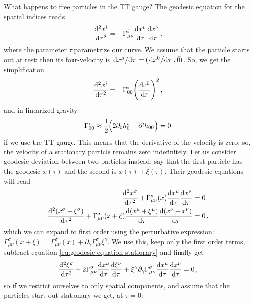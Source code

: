 \documentclass[main.tex]{subfiles}
\begin{document}
What happens to free particles in the TT gauge? The geodesic equation for the spatial indices reads 
%
\begin{align}
\dv[2]{x^{i}}{\tau} = - \Gamma^{i}_{\mu \nu } \dv{x^{\mu }}{\tau } \dv{x^{\nu }}{\tau }
\,,
\end{align}
%
where the parameter \(\tau \) parametrize our curve. 
We assume that the particle starts out at rest: then its four-velocity is \(\dv*{x^{\mu }}{\tau } = (\dv*{x^{0}}{\tau }, \vec{0})\). So, we get the simplification 
%
\begin{align}
  \dv[2]{x^{i}}{\tau} =
  - \Gamma^{i}_{00} \qty(\dv{x^{0}}{\tau })^2
\,,
\end{align}
%
and in linearized gravity  
%
\begin{align}
\Gamma^{i}_{00} \approx \frac{1}{2} \qty(2 \partial_0 h^{i}_{0} - \partial^{i} h_{00} ) =0
\,
\end{align}
%
if we use the TT gauge. 
This means that the derivative of the velocity is zero: so, the velocity of a stationary particle remains zero indefinitely. 
Let us consider geodesic deviation between two particles instead: say that the first particle has the geodesic \(x(\tau )\) and the second is \(x(\tau ) + \xi (\tau )\). Their geodesic equations will read 
%
\begin{subequations}
\begin{align}
\dv[2]{x^{\sigma }}{\tau } + \Gamma^{\sigma }_{\mu \nu } (x) \dv{x^{\mu  }}{\tau } \dv{x^{\nu }}{\tau } &= 0 \label{eq:geodesic-equation-stationary}\\
\dv[2]{(x^{\sigma } + \xi^{\sigma}) }{\tau } + \Gamma^{\sigma }_{\mu \nu } (x + \xi ) \dv{(x^{\mu  } + \xi^{\mu })}{\tau } \dv{(x^{\nu } + x^{\nu })}{\tau } &= 0 
\,,
\end{align}
\end{subequations}
%
which we can expand to first order using the perturbative expression: \(\Gamma^{\sigma }_{\mu \nu } (x + \xi ) = \Gamma^{\sigma }_{\mu \nu } (x) + \partial_{\gamma } \Gamma^{\sigma }_{\mu \nu } \xi^{\gamma } \). We use this, keep only the first order terms, subtract equation \eqref{eq:geodesic-equation-stationary} and finally get 
%
\begin{align}
\dv[2]{\xi^{\sigma }}{\tau } + 2 \Gamma^{\sigma}_{\mu \nu } \dv{x^{\mu }}{\tau } \dv{\xi^{\nu }}{\tau } + \xi^{\gamma } \partial_{\gamma } \Gamma^{\sigma}_{\mu \nu } \dv{x^{\mu }}{\tau } \dv{x^{\nu }}{\tau } = 0
\,,
\end{align}
%
so if we restrict ourselves to only spatial components, and assume that the particles start out stationary we get, at \(\tau = 0\):
\end{document}
